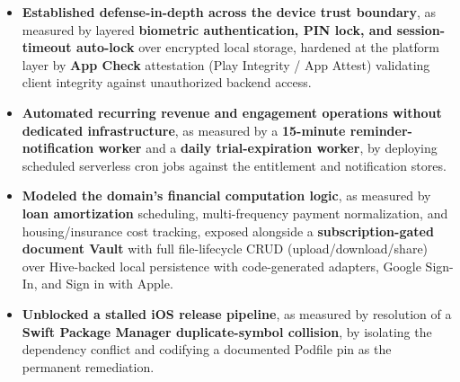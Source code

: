 \documentclass[10pt,letterpaper]{article}
\newenvironment{highlights}{
  \begin{itemize}[topsep=2pt,parsep=1pt,partopsep=0pt,itemsep=0pt,leftmargin=10pt]
}{\end{itemize}}
\begin{document}
\begin{highlights}
  \item \textbf{Established defense-in-depth across the device trust boundary}, as measured by layered \textbf{biometric authentication, PIN lock, and session-timeout auto-lock} over encrypted local storage, hardened at the platform layer by \textbf{App Check} attestation (Play Integrity / App Attest) validating client integrity against unauthorized backend access.
  \item \textbf{Automated recurring revenue and engagement operations without dedicated infrastructure}, as measured by a \textbf{15-minute reminder-notification worker} and a \textbf{daily trial-expiration worker}, by deploying scheduled serverless cron jobs against the entitlement and notification stores.
  \item \textbf{Modeled the domain's financial computation logic}, as measured by \textbf{loan amortization} scheduling, multi-frequency payment normalization, and housing/insurance cost tracking, exposed alongside a \textbf{subscription-gated document Vault} with full file-lifecycle CRUD (upload/download/share) over Hive-backed local persistence with code-generated adapters, Google Sign-In, and Sign in with Apple.
  \item \textbf{Unblocked a stalled iOS release pipeline}, as measured by resolution of a \textbf{Swift Package Manager duplicate-symbol collision}, by isolating the dependency conflict and codifying a documented Podfile pin as the permanent remediation.
\end{highlights}

\vspace{3pt}
\end{document}
